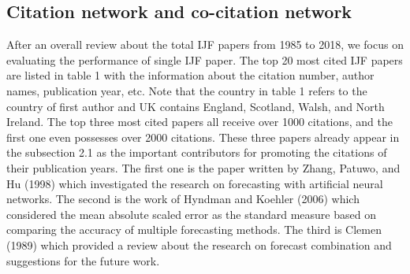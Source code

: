 \documentclass[11pt,a4paper]{elsarticle} %
\begin{document}
\subsection{Citation network and co-citation
network}\label{citation-network-and-co-citation-network}

After an overall review about the total IJF papers from 1985 to 2018, we
focus on evaluating the performance of single IJF paper. The top 20 most
cited IJF papers are listed in table 1 with the information about the
citation number, author names, publication year, etc. Note that the
country in table 1 refers to the country of first author and UK contains
England, Scotland, Walsh, and North Ireland. The top three most cited
papers all receive over 1000 citations, and the first one even possesses
over 2000 citations. These three papers already appear in the subsection
2.1 as the important contributors for promoting the citations of their
publication years. The first one is the paper written by Zhang, Patuwo,
and Hu (1998) which investigated the research on forecasting with
artificial neural networks. The second is the work of Hyndman and
Koehler (2006) which considered the mean absolute scaled error as the
standard measure based on comparing the accuracy of multiple forecasting
methods. The third is Clemen (1989) which provided a review about the
research on forecast combination and suggestions for the future work.
\end{document}
